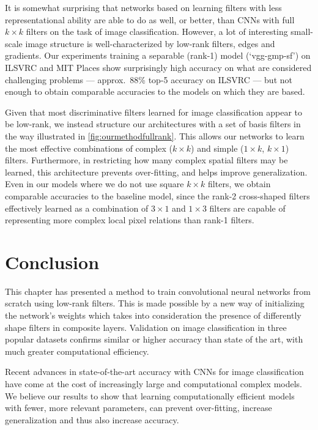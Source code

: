 \documentclass[thesis]{subfiles}
\begin{document}
    It is somewhat surprising that networks based on learning filters with less representational ability are able to do as well, or better, than CNNs with full $k\times k$ filters on the task of image classification. However, a lot of interesting small-scale image structure is well-characterized by low-rank filters, \eg edges and gradients. Our experiments training a separable (rank-1) model (`vgg-gmp-sf') on ILSVRC and MIT Places show surprisingly high accuracy on what are considered challenging problems --- approx.\ 88\% top-5 accuracy on ILSVRC --- but not enough to obtain comparable accuracies to the models on which they are based.
    
    Given that most discriminative filters learned for image classification appear to be low-rank, we instead structure our architectures with a set of basis filters in the way illustrated in \cref{fig:ourmethodfullrank}. This allows our networks to learn the most effective combinations of complex (\eg $k\times k$) and simple (\eg $1\times k$, $k\times 1$) filters. Furthermore, in restricting how many complex spatial filters may be learned, this architecture prevents over-fitting, and helps improve generalization. Even in our models where we do not use square $k\times k$ filters, we obtain comparable accuracies to the baseline model, since the rank-2 cross-shaped filters effectively learned as a combination of $3 \times 1$ and $1 \times 3$ filters are capable of representing more complex local pixel relations than rank-1 filters.
    
    \section{Conclusion}
    This chapter has presented a method to train convolutional neural networks from scratch using low-rank filters. This is made possible by a new way of initializing the network’s weights which takes into consideration the presence of differently shape filters in composite layers. 
    Validation on image classification in three popular datasets confirms similar or higher accuracy than state of the art, with much greater computational efficiency. 
    
    Recent advances in state-of-the-art accuracy with CNNs for image classification have come at the cost of increasingly large and computational complex models. We believe our results to show that learning computationally efficient models with fewer, more relevant parameters, can prevent over-fitting, increase generalization and thus also increase accuracy.
    
    
\end{document}
